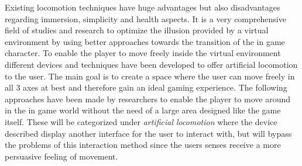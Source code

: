 
Existing locomotion techniques have huge advantages but also disadvantages regarding immersion, simplicity and health aspects. It is a very comprehensive field of studies and research to optimize the illusion provided by a virtual environment by using better approaches towards the transition of the in game character.\newline
To enable the player to move freely inside the virtual environment different devices and techniques have been developed to offer artificial locomotion to the user. The main goal is to create a space where the user can move freely in all 3 axes at best and therefore gain an ideal gaming experience.\newline
The following approaches have been made by researchers to enable the player to move around in the in game world without the need of a large area designed like the game itself. These will be categorized under \textit{artificial locomotion} where the device described display another interface for the user to interact with, but will bypass the problems of this interaction method since the users senses receive a more persuasive feeling of movement.
